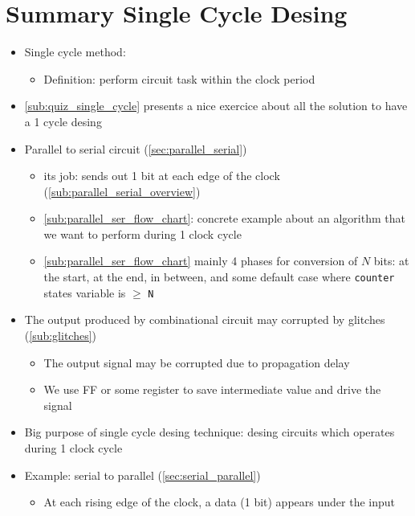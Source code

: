 \newpage
\section{ Summary Single Cycle Desing}

\begin{itemize}

\item Single cycle method:

	\begin{itemize}
	\item Definition: perform circuit task within the clock period
	\end{itemize}

\item \ref{sub:quiz_single_cycle} presents a nice exercice about all the solution to have a 1 cycle desing


\item Parallel to serial circuit (\ref{sec:parallel_serial})

	\begin{itemize}

	\item its job: sends out 1 bit at each edge of the clock (\ref{sub:parallel_serial_overview}) 

	\item \ref{sub:parallel_ser_flow_chart}: concrete example 
	about an algorithm that we want to perform during 1 clock cycle 
	
	\item \ref{sub:parallel_ser_flow_chart} mainly 4 phases for conversion of $N$ bits: at the start, at the end, in between, and some default case where \verb|counter| states variable is $\geq$ \verb|N|

	\end{itemize}

\item The output produced by combinational circuit may corrupted by glitches (\ref{sub:glitches})

	\begin{itemize}

	\item The output signal may be corrupted due to propagation delay
	
	\item We use FF or some register to save intermediate value and drive the signal
	
	\end{itemize}


\item Big purpose of single cycle desing technique: desing circuits which operates during 1 clock cycle

\item Example: serial to parallel (\ref{sec:serial_parallel})

	\begin{itemize}
	\item At each rising edge of the clock, a data (1 bit) appears under the input
	\end{itemize}


\end{itemize}












